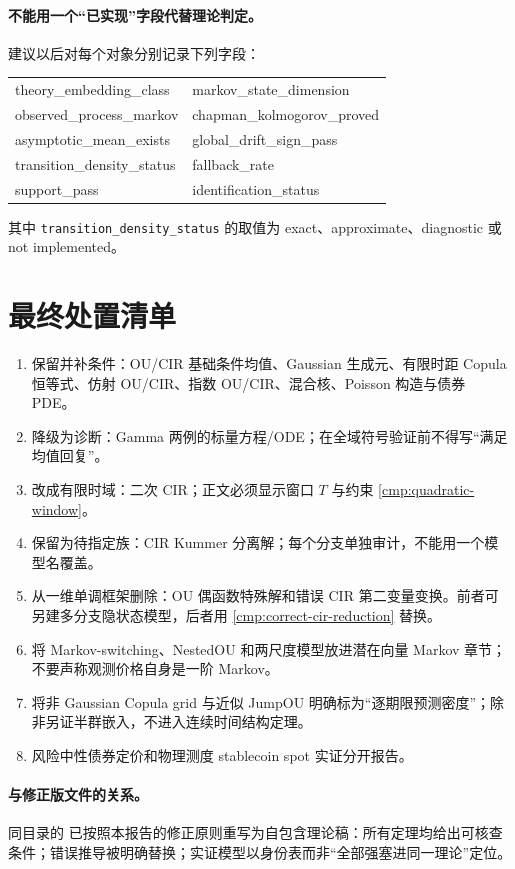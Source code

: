 \documentclass[UTF8,11pt]{ctexart}
\begin{document}
\paragraph{不能用一个“已实现”字段代替理论判定。}
建议以后对每个对象分别记录下列字段：
\begin{center}
\small\ttfamily
\begin{tabular}{@{}ll@{}}
theory\_embedding\_class & markov\_state\_dimension\\
observed\_process\_markov & chapman\_kolmogorov\_proved\\
asymptotic\_mean\_exists & global\_drift\_sign\_pass\\
transition\_density\_status & fallback\_rate\\
support\_pass & identification\_status
\end{tabular}
\end{center}
其中 \texttt{transition\_density\_status} 的取值为
exact、approximate、diagnostic 或 not implemented。

\section{最终处置清单}

\begin{enumerate}[label=\arabic*.]
  \item 保留并补条件：OU/CIR 基础条件均值、Gaussian 生成元、有限时距 Copula 恒等式、仿射 OU/CIR、指数 OU/CIR、混合核、Poisson 构造与债券 PDE。
  \item 降级为诊断：Gamma 两例的标量方程/ODE；在全域符号验证前不得写“满足均值回复”。
  \item 改成有限时域：二次 CIR；正文必须显示窗口 $T$ 与约束 \eqref{cmp:quadratic-window}。
  \item 保留为待指定族：CIR Kummer 分离解；每个分支单独审计，不能用一个模型名覆盖。
  \item 从一维单调框架删除：OU 偶函数特殊解和错误 CIR 第二变量变换。前者可另建多分支隐状态模型，后者用 \eqref{cmp:correct-cir-reduction} 替换。
  \item 将 Markov-switching、NestedOU 和两尺度模型放进潜在向量 Markov 章节；不要声称观测价格自身是一阶 Markov。
  \item 将非 Gaussian Copula grid 与近似 JumpOU 明确标为“逐期限预测密度”；除非另证半群嵌入，不进入连续时间结构定理。
  \item 风险中性债券定价和物理测度 stablecoin spot 实证分开报告。
\end{enumerate}

\paragraph{与修正版文件的关系。}
同目录的  已按照本报告的修正原则重写为自包含理论稿：所有定理均给出可核查条件；错误推导被明确替换；实证模型以身份表而非“全部强塞进同一理论”定位。
\end{document}
